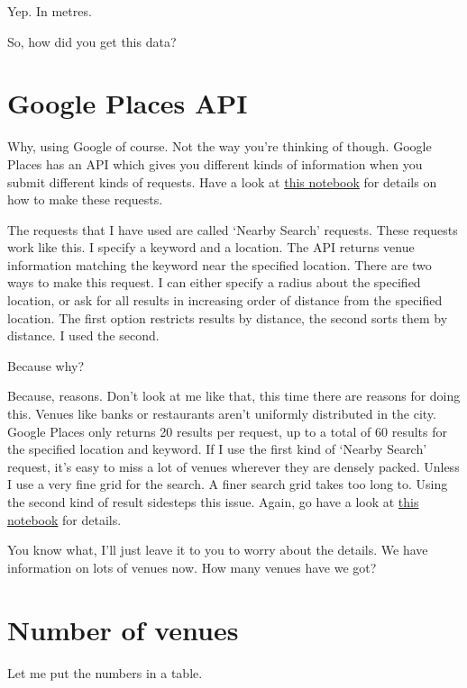 Yep. In metres. 


{\color{blue} So, how did you get this data?}


\section{Google Places API}

Why, using Google of course. Not the way you're thinking of though. Google Places has an API which gives you different kinds of information when you submit different kinds of requests. Have a look at \href{https://github.com/saba-vadarevu/IBM-dataScience-Capstone/blob/master/final/intro_data.ipynb}{this notebook} for details on how to make these requests.

The requests that I have used are called `Nearby Search' requests. These requests work like this. I specify a keyword and a location. The API returns venue information matching the keyword near the specified location. There are two ways to make this request. I can either specify a radius about the specified location, or ask for all results in increasing order of distance from the specified location. The first option restricts results by distance, the second sorts them by distance. I used the second. 

{\color{blue} Because why?}

Because, reasons. Don't look at me like that, this time there are reasons for doing this. Venues like banks or restaurants aren't uniformly distributed in the city. Google Places only returns 20 results per request, up to a total of 60 results for the specified location and keyword. If I use the first kind of `Nearby Search' request, it's easy to miss a lot of venues wherever they are densely packed. Unless I use a very fine grid for the search. A finer search grid takes too long to. Using the second kind of result sidesteps this issue. Again, go have a look at \href{https://github.com/saba-vadarevu/IBM-dataScience-Capstone/blob/master/final/intro_data.ipynb}{this notebook} for details.

{\color{blue} You know what, I'll just leave it to you to worry about the details. We have information on lots of venues now. How many venues have we got?}

\section{Number of venues}
Let me put the numbers in a table. 

